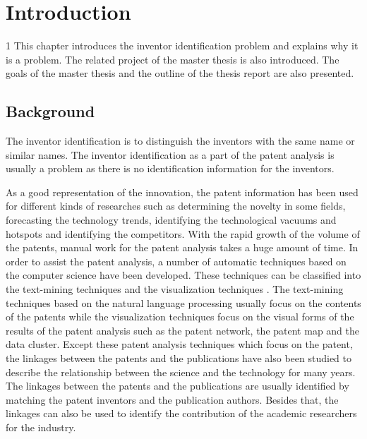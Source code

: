 \chapter{Introduction}
\label{cha:intro}
1 This chapter introduces the inventor identification problem and explains why it is a problem. The related project of the master thesis is also introduced. The goals of the master thesis and the outline of the thesis report are also presented.

\section{Background}
The inventor identification is to distinguish the inventors with the same name or similar names. The inventor identification as a part of the patent analysis is usually a problem as there is no identification information for the inventors.\newline

As a good representation of the innovation, the patent information has been used for different kinds of researches such as determining the novelty in some fields, forecasting the technology trends, identifying the technological vacuums and hotspots and identifying the competitors. With the rapid growth of the volume of the patents, manual work for the patent analysis takes a huge amount of time. In order to assist the patent analysis, a number of automatic techniques based on the computer science have been developed. These techniques can be classified into the text-mining techniques and the visualization techniques \cite{Abbas20143}. The text-mining techniques based on the natural language processing usually focus on the contents of the patents while the visualization techniques focus on the visual forms of the results of the patent analysis such as the patent network, the patent map and the data cluster.  Except these patent analysis techniques which focus on the patent, the linkages between the patents and the publications have also been studied to describe the relationship between the science and the technology for many years. The linkages between the patents and the publications are usually identified by matching the patent inventors and the publication authors.  Besides that, the linkages can also be used to identify the contribution of the academic researchers for the industry. \newline

